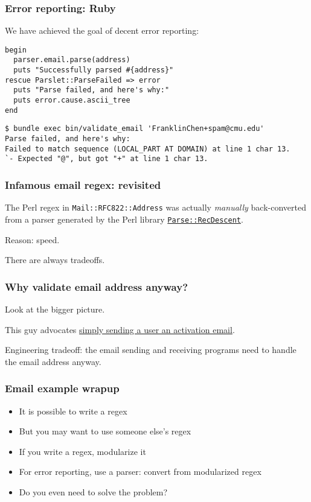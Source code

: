 \begin{frame}[fragile]
  \frametitle{Error reporting: Ruby}

  We have achieved the goal of decent error reporting:

  \begin{verbatim}
begin
  parser.email.parse(address)
  puts "Successfully parsed #{address}"
rescue Parslet::ParseFailed => error
  puts "Parse failed, and here's why:"
  puts error.cause.ascii_tree
end
  \end{verbatim}

  \begin{verbatim}
$ bundle exec bin/validate_email 'FranklinChen+spam@cmu.edu'
Parse failed, and here's why:
Failed to match sequence (LOCAL_PART AT DOMAIN) at line 1 char 13.
`- Expected "@", but got "+" at line 1 char 13.
  \end{verbatim}
\end{frame}

\begin{frame}
  \frametitle{Infamous email regex: revisited}

  The Perl regex in \texttt{Mail::RFC822::Address} was actually \emph{manually} back-converted from a parser generated by the Perl library \href{http://search.cpan.org/~jtbraun/Parse-RecDescent-1.967009/lib/Parse/RecDescent.pm}{\texttt{Parse::RecDescent}}.

  Reason: speed.

  There are always tradeoffs.
\end{frame}



\begin{frame}
  \frametitle{Why validate email address anyway?}

  Look at the bigger picture.

  This guy advocates \href{http://davidcel.is/blog/2012/09/06/stop-validating-email-addresses-with-regex/}{simply sending a user an activation email}.

  Engineering tradeoff: the email sending and receiving programs need to handle the email address anyway.
\end{frame}

\begin{frame}
  \frametitle{Email example wrapup}

  \begin{itemize}
    \item It is possible to write a regex
    \item But you may want to use someone else's regex
    \item If you write a regex, modularize it
    \item For error reporting, use a parser: convert from modularized regex
    \item Do you even need to solve the problem?
  \end{itemize}
\end{frame}

